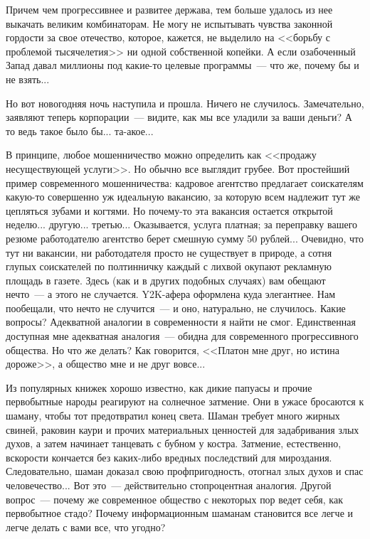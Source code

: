 \documentclass{scrbook}
\newcommand{\flqq}{<<}
\newcommand{\frqq}{>>}
\newcommand{\mdash}{~--- }
\begin{document}
Причем чем прогрессивнее и развитее держава, тем больше удалось из нее выкачать великим комбинаторам. Не могу не испытывать чувства законной гордости за свое отечество, которое, кажется, не выделило на {\flqq}борьбу с проблемой тысячелетия{\frqq} ни одной собственной копейки. А если озабоченный Запад давал миллионы под какие-то целевые программы{\mdash}что же, почему бы и не взять...

Но вот новогодняя ночь наступила и прошла. Ничего не случилось. Замечательно, заявляют теперь корпорации{\mdash}видите, как мы все уладили за ваши деньги? А то ведь такое было бы... та-акое...

В принципе, любое мошенничество можно определить как {\flqq}продажу несуществующей услуги{\frqq}. Но обычно все выглядит грубее. Вот простейший пример современного мошенничества: кадровое агентство предлагает соискателям какую-то совершенно уж идеальную вакансию, за которую всем надлежит тут же цепляться зубами и когтями. Но почему-то эта вакансия остается открытой неделю... другую... третью... Оказывается, услуга платная; за переправку вашего резюме работодателю агентство берет смешную сумму 50 рублей... Очевидно, что тут ни вакансии, ни работодателя просто не существует в природе, а сотня глупых соискателей по полтинничку каждый с лихвой окупают рекламную площадь в газете. Здесь (как и в других подобных случаях) вам обещают нечто{\mdash}а этого не случается. Y2K-афера оформлена куда элегантнее. Нам пообещали, что нечто не случится{\mdash}и оно, натурально, не случилось. Какие вопросы? Адекватной аналогии в современности я найти не смог. Единственная доступная мне адекватная аналогия{\mdash}обидна для современного прогрессивного общества. Но что же делать? Как говорится, {\flqq}Платон мне друг, но истина дороже{\frqq}, а общество мне и не друг вовсе...

Из популярных книжек хорошо известно, как дикие папуасы и прочие первобытные народы реагируют на солнечное затмение. Они в ужасе бросаются к шаману, чтобы тот предотвратил конец света. Шаман требует много жирных свиней, раковин каури и прочих материальных ценностей для задабривания злых духов, а затем начинает танцевать с бубном у костра. Затмение, естественно, вскорости кончается без каких-либо вредных последствий для мироздания. Следовательно, шаман доказал свою профпригодность, отогнал злых духов и спас человечество... Вот это{\mdash}действительно стопроцентная аналогия. Другой вопрос{\mdash}почему же современное общество с некоторых пор ведет себя, как первобытное стадо? Почему информационным шаманам становится все легче и легче делать с вами все, что угодно?
\end{document}
